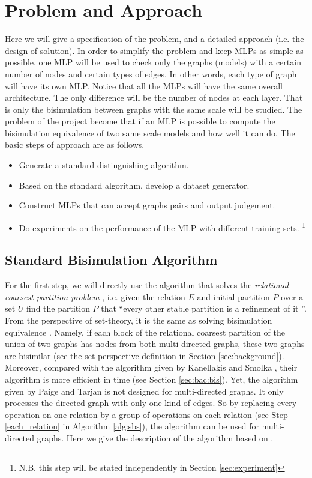 \section{Problem and Approach}
\label{sec:description}

Here we will give a specification of the problem, and a detailed approach (i.e. the design of solution).
In order to simplify the problem and keep MLPs as simple as possible, one MLP will be used to check only the graphs (models) with a certain number of nodes and certain types of edges.
In other words, each type of graph will have its own MLP.
Notice that all the MLPs will have the same overall architecture.
The only difference will be the number of nodes at each layer.
That is only the bisimulation between graphs with the same scale will be studied.
The problem of the project become that if an MLP is possible to compute the bisimulation equivalence of two same scale models and how well it can do.
The basic steps of approach are as follows.
\begin{itemize}
    \item Generate a standard distinguishing algorithm.
    \item Based on the standard algorithm, develop a dataset generator.
    \item Construct MLPs that can accept graphs pairs and output judgement.
    \item Do experiments on the performance of the MLP with different training sets. \footnote{N.B. this step will be stated independently in Section \ref{sec:experiment}}
\end{itemize}


\subsection{Standard Bisimulation Algorithm}
For the first step, we will directly use the algorithm that solves the \emph{relational coarsest partition problem} \cite{Paige1987}, i.e. given the relation $E$ and initial partition $P$ over a set $U$ find the partition $P$ that \textquotedblleft every other stable partition is a refinement of it \textquotedblright.
From the perspective of set-theory, it is the same as solving bisimulation equivalence \cite{Dovier2004}.
Namely, if each block of the relational coarsest partition of the union of two graphs has nodes from both multi-directed graphs, these two graphs are bisimilar (see the set-perspective definition in Section \ref{sec:background}).
Moreover, compared with the algorithm given by Kanellakis and Smolka \cite{Milner1980}, their algorithm is more efficient in time (see Section \ref{sec:bac:bis}).
Yet, the algorithm given by Paige and Tarjan is not designed for multi-directed graphs.
It only processes the directed graph with only one kind of edges.
So by replacing every operation on one relation by a group of operations on each relation (see Step \ref{each_relation} in Algorithm \ref{alg:sbs}), the algorithm can be used for multi-directed graphs.
Here we give the description of the algorithm based on \cite{Paige1987}.

